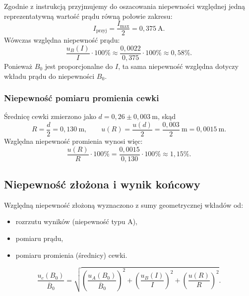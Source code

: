 \documentclass{fizykalab}
\begin{document}
Zgodnie z instrukcją przyjmujemy do oszacowania niepewności
względnej jedną reprezentatywną wartość prądu równą połowie
zakresu:
\begin{equation}
  I_{\text{przyj}} = \frac{I_{\max}}{2}
  = 0{,}375~\text{A}.
\end{equation}
Wówczas względna niepewność prądu:
\begin{equation}
  \frac{u_B(I)}{I}\cdot 100\%
  \approx
  \frac{0{,}0022}{0{,}375}\cdot 100\%
  \approx 0{,}58\%.
\end{equation}
Ponieważ \(B_0\) jest proporcjonalne do \(I\), ta sama
niepewność względna dotyczy wkładu prądu do niepewności
\(B_0\).

\subsubsection*{Niepewność pomiaru promienia cewki}

Średnicę cewki zmierzono jako
\(d = 0{,}26 \pm 0{,}003~\text{m}\), skąd
\begin{equation}
  R = \frac{d}{2} = 0{,}130~\text{m},
  \qquad u(R) = \frac{u(d)}{2} =
  \frac{0{,}003}{2}~\text{m}
  = 0{,}0015~\text{m}.
\end{equation}
Względna niepewność promienia wynosi więc:
\begin{equation}
  \frac{u(R)}{R}\cdot 100\%
  = \frac{0{,}0015}{0{,}130}\cdot 100\%
  \approx 1{,}15\%.
\end{equation}

\subsection{Niepewność złożona i wynik końcowy}

Względną niepewność złożoną wyznaczono z sumy geometrycznej
wkładów od:
\begin{itemize}
  \item rozrzutu wyników (niepewność typu A),
  \item pomiaru prądu,
  \item pomiaru promienia (średnicy) cewki.
\end{itemize}

\begin{equation}
  \frac{u_c(B_0)}{\overline{B}_0}
  =
  \sqrt{
    \left(
      \frac{u_A(B_0)}{\overline{B}_0}
    \right)^2
    +
    \left(
      \frac{u_B(I)}{I}
    \right)^2
    +
    \left(
      \frac{u(R)}{R}
    \right)^2
  }.
\end{equation}
\end{document}
